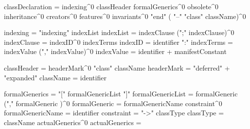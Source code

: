 classDeclaration = 
  indexing^0
  classHeader
  formalGenerics^0
  obsolete^0
  inheritance^0
  creators^0
  features^0
  invariants^0
  "end" ( "--" "class" className)^0
  
indexing = "indexing" indexList
indexList = indexClause (";" indexClause)^0
indexClause = indexID^0 indexTerms
indexID = identifier ":"
indexTerms = indexValue ("," indexValue)^0
indexValue = identifier + manifestConstant

classHeader = headerMark^0 "class" className
headerMark = "deferred" + "expanded"
className = identifier

formalGenerics = "[" formalGenericList "]"
formalGenericList = formalGeneric ("," formalGeneric )^0
formalGeneric     = formalGenericName constraint^0
formalGenericName = identifier
constraint = "->" classType
classType = className actualGenerics^0
actualGenerics = 

\stoptyping

